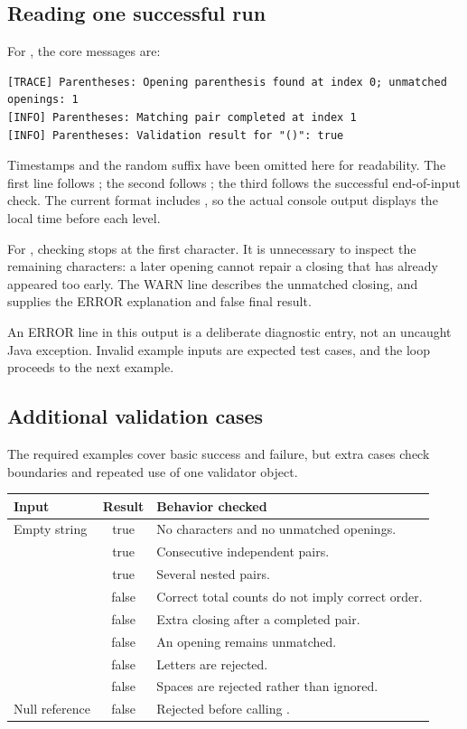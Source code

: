 \subsection{Reading one successful run}
For \code{()}, the core messages are:
\begin{lstlisting}[language={}]
[TRACE] Parentheses: Opening parenthesis found at index 0; unmatched openings: 1
[INFO] Parentheses: Matching pair completed at index 1
[INFO] Parentheses: Validation result for "()": true
\end{lstlisting}
Timestamps and the random suffix have been omitted here for readability. The first line follows ; the second follows ; the third follows the successful end-of-input check. The current format includes , so the actual console output displays the local time before each level.

For \code{)((()))}, checking stops at the first character. It is unnecessary to inspect the remaining characters: a later opening cannot repair a closing that has already appeared too early. The WARN line describes the unmatched closing, and  supplies the ERROR explanation and false final result.

An ERROR line in this output is a deliberate diagnostic entry, not an uncaught Java exception. Invalid example inputs are expected test cases, and the loop proceeds to the next example.

\newpage
\subsection{Additional validation cases}
The required examples cover basic success and failure, but extra cases check boundaries and repeated use of one validator object.

\begin{tabularx}{\textwidth}{@{}p{35mm}cY@{}}
\toprule
\textbf{Input} & \textbf{Result} & \textbf{Behavior checked}\\
\midrule
Empty string & true & No characters and no unmatched openings.\\
\code{()()} & true & Consecutive independent pairs.\\
\code{((()))} & true & Several nested pairs.\\
\code{)(} & false & Correct total counts do not imply correct order.\\
\code{())} & false & Extra closing after a completed pair.\\
\code{(()} & false & An opening remains unmatched.\\
 & false & Letters are rejected.\\
\code{( )} & false & Spaces are rejected rather than ignored.\\
Null reference & false & Rejected before calling .\\
\bottomrule
\end{tabularx}

